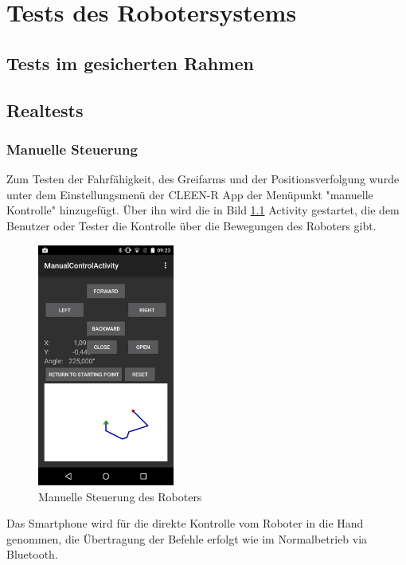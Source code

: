 \chapter{Tests des Robotersystems}
\label{cha:Tests}
\section{Tests im gesicherten Rahmen}

\section{Realtests}

\subsection*{Manuelle Steuerung}

Zum Testen der Fahrfähigkeit, des Greifarms und der Positionsverfolgung wurde unter dem Einstellungsmenü der CLEEN-R App der Menüpunkt "manuelle Kontrolle" hinzugefügt. Über ihn wird die in Bild \ref{fig:manualControl} Activity gestartet, die dem Benutzer oder Tester die Kontrolle über die Bewegungen des Roboters gibt.

\begin{figure}[h]
\centering
\includegraphics[width=0.4\textwidth]{Bilder/Tests/manualControl}
\caption{Manuelle Steuerung des Roboters}
\label{fig:manualControl}
\end{figure}

Das Smartphone wird für die direkte Kontrolle vom Roboter in die Hand genommen, die Übertragung der Befehle erfolgt wie im Normalbetrieb via Bluetooth.

